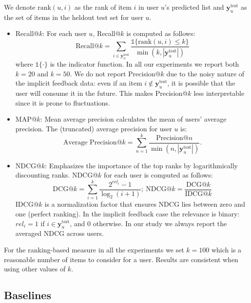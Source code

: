 \documentclass{sig-alternate-arxiv}
\begin{document}
We denote $\text{rank}(u, i)$ as the rank of item $i$ in user $u$'s
predicted list and $\mathbf{y}_u^{\text{test}}$ as the set of items in the
heldout test set for user $u$.

\begin{itemize}
\item Recall@$k$: For each user $u$, Recall@$k$ is computed as follows:
\begin{displaymath}
\text{Recall@}k =\sum_{i\in\mathbf{y}^{\text{test}}_u} \frac{\mathds{1}\{\text{rank}(u, i) \leq k\}}{\min(k, |\mathbf{y}_u^{\text{test}}|) }
\end{displaymath}
where $\mathds{1}\{\cdot\}$ is the indicator function. In all our experiments we report both $k=20$ and $k=50$. We do not report Precision@$k$ due to the noisy nature of the implicit feedback data: even if an item $i\notin \mathbf{y}_u^{\text{test}}$, it is possible that the user will consume it in the future. This makes Precision@$k$ less interpretable since it is prone to fluctuations. 
\item MAP@$k$: Mean average precision calculates the mean of users' average precision. The (truncated) average precision for user $u$ is: 
\begin{displaymath}
  \text{Average Precision}@k = \sum_{n=1}^k \frac{\text{Precision}@n}{\min(n,|\mathbf{y}_u^{\text{test}}|)}.
\end{displaymath}
\item NDCG@$k$: Emphasizes the importance of the top ranks by logarithmically discounting ranks. NDCG@$k$ for each user is computed as follows:
\begin{displaymath}
\text{DCG}@k = \sum_{i=1}^k \frac{2^{rel_i} - 1}{\log_2(i + 1)}; ~ \text{NDCG}@k = \frac{\text{DCG}@k}{\text{IDCG}@k}
\end{displaymath}
IDCG$@k$ is a normalization factor that ensures NDCG lies between zero and one
(perfect ranking). In the implicit feedback case the relevance is binary:
$rel_i = 1$ if $i\in \mathbf{y}_u^{\text{test}}$, and 0 otherwise. In our
study we always report the averaged NDCG across users. 
\end{itemize}

For the ranking-based measure in all the experiments we set $k=100$ which
is a reasonable number of items to consider for a user. Results are
consistent when using other values of $k$. 
 

\subsection{Baselines}
\end{document}
